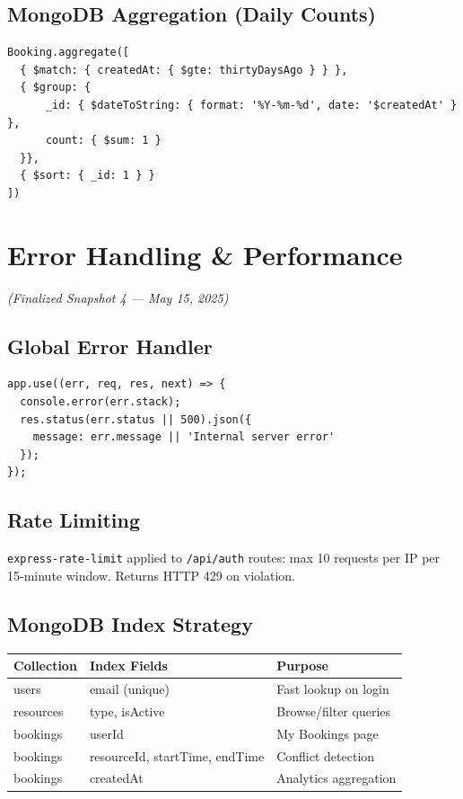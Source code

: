 \documentclass[12pt]{article}
\begin{document}
\subsection{MongoDB Aggregation (Daily Counts)}
\begin{verbatim}
Booking.aggregate([
  { $match: { createdAt: { $gte: thirtyDaysAgo } } },
  { $group: {
      _id: { $dateToString: { format: '%Y-%m-%d', date: '$createdAt' } },
      count: { $sum: 1 }
  }},
  { $sort: { _id: 1 } }
])
\end{verbatim}

\section{Error Handling \& Performance}
\textit{(Finalized Snapshot 4 --- May 15, 2025)}

\subsection{Global Error Handler}
\begin{verbatim}
app.use((err, req, res, next) => {
  console.error(err.stack);
  res.status(err.status || 500).json({
    message: err.message || 'Internal server error'
  });
});
\end{verbatim}

\subsection{Rate Limiting}
\texttt{express-rate-limit} applied to \texttt{/api/auth} routes: max 10 requests per IP per 15-minute window. Returns HTTP 429 on violation.

\subsection{MongoDB Index Strategy}

\begin{longtable}{|p{3cm}|p{3cm}|p{7cm}|}
\hline
\textbf{Collection} & \textbf{Index Fields} & \textbf{Purpose} \\
\hline
users       & email (unique)                     & Fast lookup on login \\
\hline
resources   & type, isActive                     & Browse/filter queries \\
\hline
bookings    & userId                             & My Bookings page \\
\hline
bookings    & resourceId, startTime, endTime     & Conflict detection \\
\hline
bookings    & createdAt                          & Analytics aggregation \\
\hline
\end{longtable}
\end{document}
